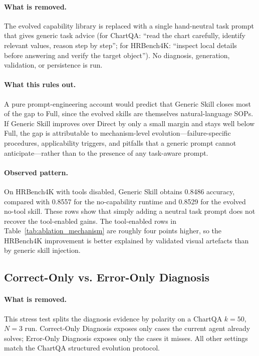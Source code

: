\paragraph{What is removed.}
The evolved capability library is replaced with a single hand-neutral task prompt that
gives generic task advice (for ChartQA: ``read the chart carefully, identify relevant
values, reason step by step''; for HRBench4K: ``inspect local details before answering and
verify the target object''). No diagnosis, generation, validation, or persistence is run.

\paragraph{What this rules out.}
A pure prompt-engineering account would predict that Generic Skill closes most of the gap
to Full, since the evolved skills are themselves natural-language SOPs. If Generic Skill
improves over Direct by only a small margin and stays well below Full, the gap is
attributable to mechanism-level evolution---failure-specific procedures, applicability
triggers, and pitfalls that a generic prompt cannot anticipate---rather than to the
presence of any task-aware prompt.

\paragraph{Observed pattern.}
On HRBench4K with tools disabled, Generic Skill obtains 0.8486 accuracy, compared with
0.8557 for the no-capability runtime and 0.8529 for the evolved no-tool skill. These rows
show that simply adding a neutral task prompt does not recover the tool-enabled gains.
The tool-enabled rows in Table~\ref{tab:ablation_mechanism} are roughly four points
higher, so the HRBench4K improvement is better explained by validated visual artefacts than
by generic skill injection.

\subsection{Correct-Only vs. Error-Only Diagnosis}
\label{app:abl_diagnosis_polarity}

\paragraph{What is removed.}
This stress test splits the diagnosis evidence by polarity on a ChartQA $k{=}50$,
$N{=}3$ run. Correct-Only Diagnosis exposes only cases the current agent already solves;
Error-Only Diagnosis exposes only the cases it misses. All other settings match the
ChartQA structured evolution protocol.

